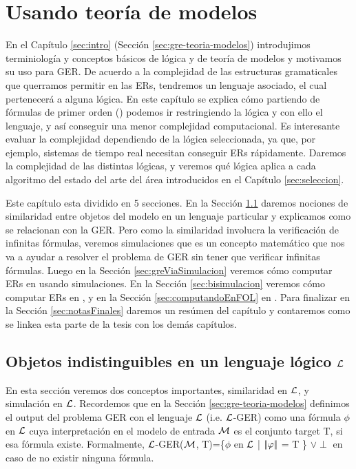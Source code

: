 \chapter{Usando teor\'ia de modelos}
\label{sec:intro_logica}

En el Cap\'itulo \ref{sec:intro} (Secci\'on \ref{sec:gre-teoria-modelos}) introdujimos terminiolog\'ia y conceptos b\'asicos de l\'ogica y de teor\'ia de modelos y motivamos su uso para GER.
De acuerdo a la complejidad de las estructuras gramaticales que querramos permitir en las ERs, tendremos un lenguaje asociado, 
el cual pertenecer\'a a alguna l\'ogica. En este cap\'itulo se explica c\'omo partiendo de f\'ormulas de primer orden (\FOL) 
podemos ir restringiendo la l\'ogica y con ello el lenguaje, y as\'i conseguir una menor complejidad computacional. Es interesante evaluar la complejidad dependiendo de la l\'ogica seleccionada, 
ya que, por ejemplo, sistemas de tiempo real necesitan conseguir ERs r\'apidamente. Daremos la complejidad de las distintas l\'ogicas, 
y veremos qu\'e l\'ogica aplica a cada algoritmo del estado del arte del \'area introducidos en el Cap\'itulo \ref{sec:seleccion}.

Este cap\'itulo esta dividido en 5 secciones. En la Secci\'on \ref{sec:seleccionandoLenguaje} daremos nociones de similaridad entre objetos del modelo en un lenguaje particular y explicamos como se relacionan con la GER. Pero como la similaridad involucra la verificaci\'on de infinitas f\'ormulas, veremos simulaciones que es un concepto matem\'atico que nos va a ayudar a resolver el problema de GER sin tener que verificar infinitas f\'ormulas. Luego en la Secci\'on \ref{sec:greViaSimulacion} veremos c\'omo computar ERs en \EL usando simulaciones. En la Secci\'on \ref{sec:bisimulacion} veremos c\'omo computar ERs en \ALC, y en la Secci\'on \ref{sec:computandoEnFOL} en \FOL. Para finalizar en la Secci\'on \ref{sec:notasFinales} daremos un res\'umen del cap\'itulo y contaremos como se linkea esta parte de la tesis con los dem\'as cap\'itulos.


\section{Objetos indistinguibles en un lenguaje l\'ogico $\mathcal{L}$}
\label{sec:seleccionandoLenguaje}

En esta secci\'on veremos dos conceptos importantes, similaridad en $\mathcal{L}$, y simulaci\'on en $\mathcal{L}$. Recordemos que en la Secci\'on \ref{sec:gre-teoria-modelos} definimos el output del problema GER con el lenguaje $\mathcal{L}$ (i.e. $\mathcal{L}$-GER) como una f\'ormula $\phi$ en $\mathcal{L}$ cuya interpretaci\'on en el modelo de entrada  $\mathcal{M}$ es el conjunto target T, si esa f\'ormula existe. Formalmente, $\mathcal{L}$-GER($\mathcal{M}$, T)=\{$\phi$ en $\mathcal{L}$ | $|\!|\varphi|\!|$ = T \} $\lor \perp$ en caso de no existir ninguna f\'ormula.

